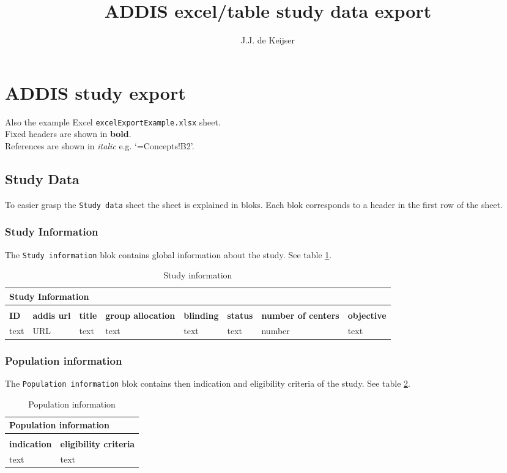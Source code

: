 \documentclass[a4paper,10pt]{article}
\title{ADDIS excel/table study data export}
\author{J.J. de Keijser}
\begin{document}
\maketitle
\section*{ADDIS study export}
Also the example Excel \texttt{excelExportExample.xlsx} sheet.\\
Fixed headers are shown in \textbf{bold}.\\
References are shown in \textit{italic} e.g. `=Concepts!B2'.

\subsection*{Study Data}
To easier grasp the \texttt{Study data} sheet the sheet is explained in bloks. Each blok corresponds to a header in the first row of the sheet.

\subsubsection*{Study Information}
The \texttt{Study information} blok contains global information about the study. See table \ref{table:Study Information}.
\begin{table}[h]
  \small
  \centering
  \caption{Study information}
  \label{table:Study Information}
  \begin{tabular}{|l|l|l|l|l|l|l|l|}
    \hline
    \multicolumn{8}{|l|}{Study Information} \\ \hline
    \multicolumn{8}{|l|}{}                  \\ \hline
    \textbf{ID} & \textbf{addis url} & \textbf{title} & \textbf{group allocation} & \textbf{blinding} & \textbf{status} & \textbf{number of centers} & \textbf{objective} \\ \hline
    text & URL & text & text & text & text & number & text \\ \hline
  \end{tabular}
\end{table}

\subsubsection*{Population information}
The \texttt{Population information} blok contains then indication and eligibility criteria of the study. See table \ref{table:Population information}.
\begin{table}[h]
  \centering
  \caption{Population information}
  \label{table:Population information}
  \begin{tabular}{|l|l|}
    \hline
    \multicolumn{2}{|l|}{\textbf{Population information}} \\ \hline
    \multicolumn{2}{|l|}{}                                \\ \hline
    \textbf{indication} & \textbf{eligibility criteria}   \\ \hline
    text & text                                           \\ \hline
  \end{tabular}
\end{table}
\end{document}
